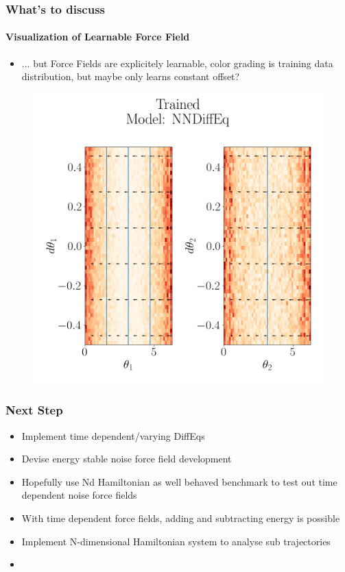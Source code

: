 \documentclass[usenames, dvipsnames, t]{beamer}
\begin{document}
\begin{frame}
	\frametitle{What's to discuss}
	\framesubtitle{Visualization of Learnable Force Field}
	\begin{itemize}
		\item ... but Force Fields are explicitely learnable, color grading is training data distribution, but maybe only learns constant offset?
	\end{itemize}
	\centering
	\begin{figure}
	\includegraphics[height=0.7\textheight]{myplot.png} 
	\end{figure}
\end{frame}

\begin{frame}
	\frametitle{Next Step}
	\begin{itemize}
		\item Implement time dependent/varying DiffEqs 
		\item Devise energy stable noise force field development
		\item Hopefully use Nd Hamiltonian as well behaved benchmark to test out time dependent noise force fields
		\item With time dependent force fields, adding and subtracting energy is possible
		\item Implement N-dimensional Hamiltonian system to analyse sub trajectories
		\item[] 
	\end{itemize}
\end{frame}
\end{document}
